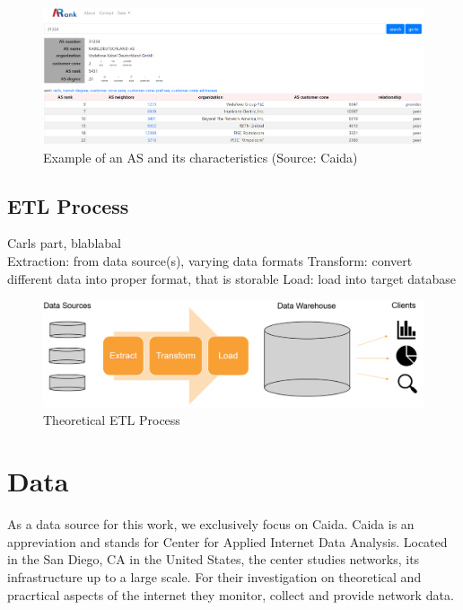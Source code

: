 \documentclass[conference]{IEEEtran}
\begin{document}
\begin{figure}[htbp]
\centerline{\includegraphics[scale=0.21]{Graphics/asExample.PNG}}
\caption{Example of an AS and its characteristics (Source: Caida)}
\label{fig}
\end{figure}



\subsection{ETL Process}

Carls part, blablabal \\ 

Extraction: from data source(s), varying data formats
Transform: convert different data into proper format, that is storable
Load: load into target database




\begin{figure}[htbp]
\centerline{\includegraphics[scale=0.3]{Graphics/ETLTheory.PNG}}
\caption{Theoretical ETL Process}
\label{fig}
\end{figure}

\section{Data}
As a data source for this work, we exclusively focus on Caida. Caida is an appreviation and stands for Center for Applied Internet Data Analysis. Located in the San Diego, CA in the United States, the center studies networks, its infrastructure up to a large scale. For their investigation on theoretical and pracrtical aspects of the internet they monitor, collect and provide network data. 
\end{document}
